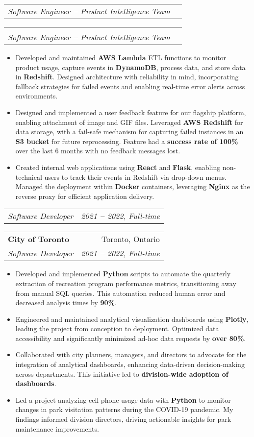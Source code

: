 \documentclass[letterpaper,10pt]{article}
\makeatletter
\newcommand{\resumeItem}[1]{
  \item\small{
    {#1 \vspace{-2pt}}
  }
}
\newcommand{\resumeSubheading}[4]{
  \vspace{-2pt}\item
    \ifthenelse{\equal{#1}{}}
    {
    \begin{tabular*}{0.97\textwidth}[t]{l@{\extracolsep{\fill}}r}
      \textit{\small#3} & \textit{\small #4} \\
    \end{tabular*}\vspace{-7pt}
    }
    {
    \begin{tabular*}{0.97\textwidth}[t]{l@{\extracolsep{\fill}}r}
      \textbf{#1} & #2 \\
      \textit{\small#3} & \textit{\small #4} \\
    \end{tabular*}\vspace{-7pt}
    }
}
\newcommand{\resumeItemListStart}{\begin{itemize}}
\newcommand{\resumeItemListEnd}{\end{itemize}\vspace{-5pt}}
\makeatother
\begin{document}
    \resumeSubheading
      {}{}
      {Software Engineer \textbf{--} Product Intelligence Team}{}
        \resumeItemListStart
            \resumeItem{Developed and maintained \textbf{AWS Lambda} ETL functions to monitor product usage, capture events in \textbf{DynamoDB}, process data, and store data in \textbf{Redshift}. Designed architecture with reliability in mind, incorporating fallback strategies for failed events and enabling real-time error alerts across environments.}
            \resumeItem{Designed and implemented a user feedback feature for our flagship platform, enabling attachment of image and GIF files. Leveraged \textbf{AWS Redshift} for data storage, with a fail-safe mechanism for capturing failed instances in an \textbf{S3 bucket} for future reprocessing. Feature had a \textbf{success rate of 100\%} over the last 6 months with no feedback messages lost.}
            \resumeItem{Created internal web applications using \textbf{React} and \textbf{Flask}, enabling non-technical users to track their events in Redshift via drop-down menus. Managed the deployment within \textbf{Docker} containers, leveraging \textbf{Nginx} as the reverse proxy for efficient application delivery.}
        \resumeItemListEnd


    \resumeSubheading
      {City of Toronto}{Toronto, Ontario}
      {Software Developer}{2021 \textbf{--} 2022, Full-time}
        \resumeItemListStart
            \resumeItem{Developed and implemented \textbf{Python} scripts to automate the quarterly extraction of recreation program performance metrics, transitioning away from manual SQL queries. This automation reduced human error and decreased analysis times by \textbf{90\%}.}
            \resumeItem{Engineered and maintained analytical visualization dashboards using \textbf{Plotly}, leading the project from conception to deployment. Optimized data accessibility and significantly minimized ad-hoc data requests by \textbf{over 80\%}.}
            \resumeItem{Collaborated with city planners, managers, and directors to advocate for the integration of analytical dashboards, enhancing data-driven decision-making across departments. This initiative led to \textbf{division-wide adoption of dashboards}.}
            \resumeItem{Led a project analyzing cell phone usage data with \textbf{Python} to monitor changes in park visitation patterns during the COVID-19 pandemic. My findings informed division directors, driving actionable insights for park maintenance improvements.}
        \resumeItemListEnd
    
\end{document}
